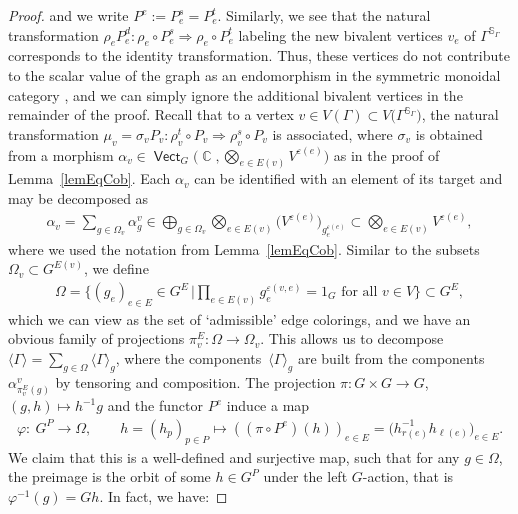 \documentclass[pdftex]{sigma}
\DeclareMathOperator{\vect}{\mathsf{Vect}}
\DeclareMathOperator{\C}{\mathbb{C}}
\newcommand{\sslash}{\mathbin{/\mkern-6mu/}}
\numberwithin{equation}{section}
\theoremstyle{definition}
\begin{document}
\begin{proof}
and we write $P^e := P_e^s = P_e^t$. Similarly, we see that the natural transformation $\rho_e P_e^d\colon \rho_e \circ P_e^s \Rightarrow \rho_e \circ P_e^t$ labeling the new bivalent vertices $v_e$ of $\Gamma^{\mathbb{S}_{\Gamma}}$ corresponds to the identity transformation. Thus, these vertices do not contribute to the scalar value of the graph as an endomorphism in the symmetric monoidal category \smash{$\vect_{\C}^{G^P\sslash G}$}, and we can simply ignore the additional bivalent vertices in the remainder of the proof. Recall that to a vertex $v \in V(\Gamma) \subset V\bigl(\Gamma^{\mathbb{S}_{\Gamma}}\bigr)$, the natural transformation $\mu_v =\sigma_v P_v\colon \rho_v^t \circ P_v \Rightarrow \rho_v^s \circ P_v$ is associated, where $\sigma_v$ is obtained from a morphism $\alpha_v \in \vect_G\bigl(\C, \bigotimes_{e \in E(v)}V^{\varepsilon(e)}\bigr)$ as in the proof of Lemma~\ref{lemEqCob}.
Each $\alpha_v$ can be identified with an element of its target and may be decomposed as
\begin{align*}
 \alpha_v = \sum_{g \in \Omega_v} \alpha_g^v \in \bigoplus_{g \in \Omega_v} \bigotimes_{e \in E(v)}\bigl(V^{\varepsilon(e)}\bigr)_{g_e^{\varepsilon(e)}} \subset \bigotimes_{e \in E(v)}V^{\varepsilon(e)},
\end{align*}
where we used the notation from Lemma~\ref{lemEqCob}. Similar to the subsets $\Omega_v \subset G^{E(v)}$, we define
\begin{align*}
 \Omega = \biggl\{(g_e)_{e \in E} \in G^E \, \bigg| \prod_{e \in E(v)} g_e^{ \varepsilon(v, e)} = 1_G \text{ for all } v \in V\biggr\} \subset G^E,
\end{align*}
which we can view as the set of `admissible' edge colorings, and we have an obvious family of projections $\pi_v^E\colon \Omega \rightarrow \Omega_v$. This allows us to decompose $\langle \Gamma \rangle = \sum_{g \in \Omega}\langle \Gamma \rangle_g$, where the components~$\langle \Gamma \rangle_g$ are built from the components~$\alpha_{\pi_v^E(g)}^v$ by tensoring and composition. The projection $\pi\colon G \times G \rightarrow G$, $(g,h) \mapsto h^{-1}g$ and the functor $P^e$ induce a map
\begin{align*}
 \varphi\colon \ G^P \rightarrow \Omega, \qquad h = (h_p)_{p \in P} \mapsto ((\pi \circ P^e)(h) )_{e \in E} = \bigl(h_{r(e)}^{-1}h_{\ell(e)}\bigr)_{e \in E}.
\end{align*}
We claim that this is a well-defined and surjective map, such that for any $g \in \Omega$, the preimage is the orbit of some $h \in G^P$ under the left $G$-action, that is $\varphi^{-1}(g) = Gh$. In fact, we have:

\end{proof}
\end{document}
